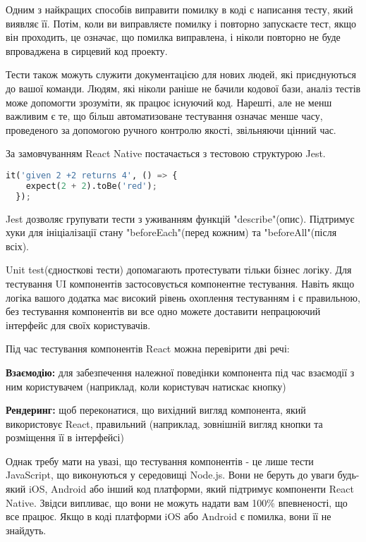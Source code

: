 Одним з найкращих способів виправити помилку в коді є написання тесту, який виявляє її.
Потім, коли ви виправляєте помилку і повторно запускаєте тест, якщо він проходить, це означає, що помилка виправлена, і ніколи повторно не буде впроваджена в сирцевий код проекту.

Тести також можуть служити документацією для нових людей, які приєднуються до вашої команди.
Людям, які ніколи раніше не бачили кодової бази, аналіз тестів може допомогти зрозуміти, як працює існуючий код.
Нарешті, але не менш важливим є те, що більш автоматизоване тестування означає менше часу, проведеного за допомогою ручного контролю якості, звільняючи цінний час.

За замовчуванням React Native постачається з тестовою структурою Jest. \cite{jest_home_page}

\begin{lstlisting}[style=light, language=Python,label={lst:rn_jest_test},caption=Jest Unit Test]
  it('given 2 +2 returns 4', () => {
    expect(2 + 2).toBe('red');
  });
\end{lstlisting}

Jest дозволяє групувати тести з уживанням функцій "describe"(опис).
Підтримує хуки для ініціалізації стану "beforeEach"(перед кожним) та "beforeAll"(після всіх).

Unit test(єдносткові тести) допомагають протестувати тільки бізнес логіку.
Для тестування UI компонентів застосовується компонентне тестування.
Навіть якщо логіка вашого додатка має високий рівень охоплення тестуванням і є правильною,
без тестування компонентів ви все одно можете доставити непрацюючий інтерфейс для своїх користувачів.

Під час тестування компонентів React можна перевірити дві речі:

\begin{itemize}
    \begin{item}
        \textbf{Взаємодію:} для забезпечення належної поведінки компонента під час взаємодії з ним користувачем (наприклад, коли користувач натискає кнопку)
    \end{item}
    \begin{item}
        \textbf{Рендеринг:} щоб переконатися, що вихідний вигляд компонента, який використовує React, правильний (наприклад, зовнішній вигляд кнопки та розміщення її в інтерфейсі)
    \end{item}
\end{itemize}

Однак требу мати на увазі, що тестування компонентів - це лише тести JavaScript, що виконуються у середовищі Node.js.
Вони не беруть до уваги будь-який iOS, Android або інший код платформи, який підтримує компоненти React Native.
Звідси випливає, що вони не можуть надати вам 100\% впевненості, що все працює.
Якщо в коді платформи iOS або Android є помилка, вони її не знайдуть.

